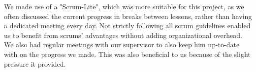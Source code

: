 We made use of a "Scrum-Lite", which was more suitable for this project, as we often discussed the current progress in breaks between lessons, rather than having a dedicated meeting every day. Not strictly following all scrum guidelines enabled us to benefit from scrums' advantages without adding organizational overhead. We also had regular meetings with our supervisor to also keep him up-to-date with on the progress we made. This was also beneficial to us because of the slight pressure it provided.

\newpage